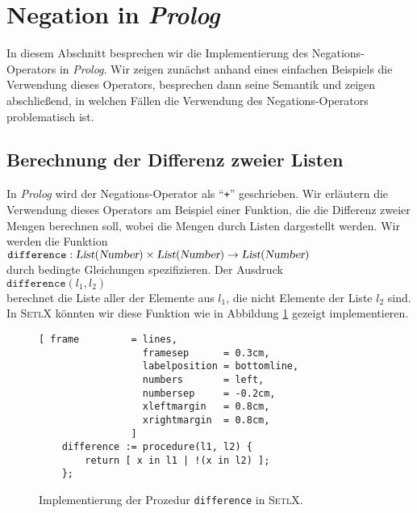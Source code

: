 \section{Negation in \textsl{Prolog}}
In diesem Abschnitt besprechen wir die Implementierung des Negations-Operators in
\textsl{Prolog}.  Wir zeigen zun\"{a}chst anhand eines einfachen Beispiels die Verwendung
dieses Operators, besprechen dann seine Semantik und zeigen abschließend, in welchen
F\"{a}llen die Verwendung des Negations-Operators problematisch ist.

\subsection{Berechnung der Differenz zweier Listen}
In \textsl{Prolog} wird der Negations-Operator als ``\texttt{+}'' geschrieben.
Wir erl\"{a}utern die Verwendung dieses 
Operators am Beispiel einer Funktion, die die Differenz zweier Mengen berechnen soll,
wobei die Mengen durch Listen dargestellt werden.  Wir werden  die Funktion \\[0.1cm]
\hspace*{1.3cm} 
$\texttt{difference}: \textsl{List}(\textsl{Number}) \times \textsl{List}(\textsl{Number}) \rightarrow \textsl{List}(\textsl{Number})$
\\[0.1cm]
durch bedingte Gleichungen spezifizieren.  Der Ausdruck \\[0.1cm]
\hspace*{1.3cm} $\mathtt{difference}(l_1,l_2)$ \\[0.1cm]
berechnet die Liste aller der Elemente aus $l_1$, die nicht Elemente der Liste $l_2$ sind.
In \textsc{SetlX} k\"{o}nnten wir diese Funktion wie in Abbildung \ref{fig:difference.stl}
gezeigt implementieren.
\begin{figure}[!ht]
\centering
\begin{Verbatim}[ frame         = lines, 
                  framesep      = 0.3cm, 
                  labelposition = bottomline,
                  numbers       = left,
                  numbersep     = -0.2cm,
                  xleftmargin   = 0.8cm,
                  xrightmargin  = 0.8cm,
                ]
    difference := procedure(l1, l2) {
        return [ x in l1 | !(x in l2) ];
    };
\end{Verbatim}
\vspace*{-0.3cm}
\caption{Implementierung der Prozedur \texttt{difference} in \textsc{SetlX}.}
\label{fig:difference.stl}
\end{figure}

